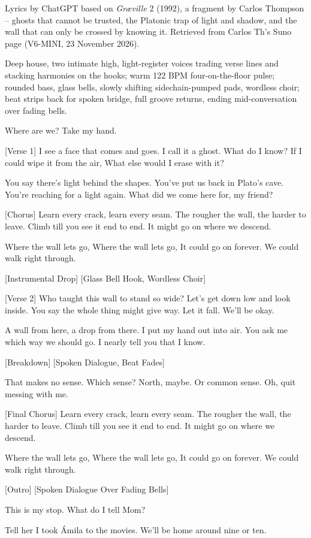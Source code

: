 \begin{notes}
Lyrics by ChatGPT based on \emph{Gr\ae ville} 2 (1992), a fragment by Carlos Thompson -- ghosts that cannot be trusted, the Platonic trap of light and shadow, and the wall that can only be crossed by knowing it. Retrieved from Carlos Th's Suno page (V6-MINI, 23 November 2026).
\end{notes}
\begin{style}
Deep house, two intimate high, light-register voices trading verse lines and stacking harmonies on the hooks; warm 122 BPM four-on-the-floor pulse; rounded bass, glass bells, slowly shifting sidechain-pumped pads, wordless choir; beat strips back for spoken bridge, full groove returns, ending mid-conversation over fading bells.
\end{style}
\begin{lyrics}

Where are we?
Take my hand.

[Verse 1]
I see a face that comes and goes.
I call it a ghost. What do I know?
If I could wipe it from the air,
What else would I erase with it?

You say there’s light behind the shapes.
You’ve put us back in Plato’s cave.
You’re reaching for a light again.
What did we come here for, my friend?

[Chorus]
Learn every crack, learn every seam.
The rougher the wall, the harder to leave.
Climb till you see it end to end.
It might go on where we descend.

Where the wall lets go,
Where the wall lets go,
It could go on forever.
We could walk right through.

[Instrumental Drop]
[Glass Bell Hook, Wordless Choir]

[Verse 2]
Who taught this wall to stand so wide?
Let’s get down low and look inside.
You say the whole thing might give way.
Let it fall. We’ll be okay.

A wall from here, a drop from there.
I put my hand out into air.
You ask me which way we should go.
I nearly tell you that I know.

[Breakdown]
[Spoken Dialogue, Beat Fades]

That makes no sense.
Which sense?
North, maybe.
Or common sense.
Oh, quit messing with me.

[Final Chorus]
Learn every crack, learn every seam.
The rougher the wall, the harder to leave.
Climb till you see it end to end.
It might go on where we descend.

Where the wall lets go,
Where the wall lets go,
It could go on forever.
We could walk right through.

[Outro]
[Spoken Dialogue Over Fading Bells]

This is my stop.
What do I tell Mom?

Tell her I took Ámila to the movies.
We’ll be home around nine or ten.
\end{lyrics}


